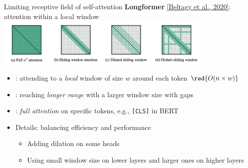 \documentclass[usenames,dvipsnames,notes,11pt,aspectratio=169,hyperref={colorlinks=true, linkcolor=blue}]{beamer}
\begin{document}
\begin{frame}
    {Limiting receptive field of self-attention}
    \textbf{Longformer} \href{https://arxiv.org/pdf/2004.05150.pdf}{[Beltagy et al., 2020]}: attention within a local window\\[1ex]

        {\includegraphics[width=0.8\textwidth]{figures/longformer}}

    \begin{itemize}
        \item {}: attending to a \textit{local} window of size $w$ around each token $\red{O(n\times w)}$
        \item {}: reaching \textit{longer range} with a larger window size with gaps
        \item {}: \textit{full attention} on specific tokens, e.g., \texttt{[CLS]} in BERT
            \pause
        \item Details: balancing efficiency and performance
            \begin{itemize}
                \item Adding dilation on some heads
                \item Using small window size on lower layers and larger ones on higher layers
            \end{itemize}
    \end{itemize}
\end{frame}
\end{document}

